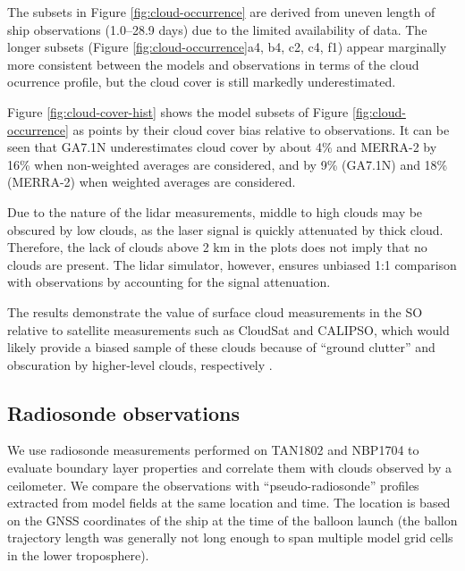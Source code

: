 The subsets in Figure \ref{fig:cloud-occurrence} are derived from uneven
length of ship observations (1.0--28.9 days) due to the limited availability of data.
The longer subsets (Figure \ref{fig:cloud-occurrence}a4, b4, c2, c4, f1)
appear marginally more consistent between the models and observations
in terms of the cloud ocurrence profile, but the cloud cover is still markedly
underestimated.

Figure \ref{fig:cloud-cover-hist} shows the model subsets of Figure
\ref{fig:cloud-occurrence} as points by their cloud cover bias relative to
observations. It can be seen that GA7.1N underestimates cloud cover by about
4\% and MERRA-2 by 16\% when non-weighted averages are considered, and by 9\%
(GA7.1N) and 18\% (MERRA-2) when weighted averages are considered.

Due to the nature of the lidar measurements, middle to high clouds may be
obscured by low clouds, as the laser signal is quickly attenuated by thick
cloud. Therefore, the lack of clouds above 2 \unit{km} in the plots does not
imply that no clouds are present. The lidar simulator, however, ensures
unbiased 1:1 comparison with observations by accounting for the signal
attenuation.

The results demonstrate the value of surface cloud measurements in the SO
relative to satellite measurements such as CloudSat and CALIPSO, which would
likely provide a biased sample of these clouds because of ``ground clutter''
and obscuration by higher-level clouds, respectively \citep{alexander2018}.

\subsection{Radiosonde observations}
\label{sec:radiosonde-observations}

We use radiosonde measurements performed on TAN1802 and NBP1704 to
evaluate boundary layer properties and correlate them with clouds observed by
a ceilometer. We compare the observations with ``pseudo-radiosonde'' profiles
extracted from model fields at the same location and time. The location is
based on the GNSS coordinates of the ship at the time of the balloon launch
(the ballon trajectory length was generally not long enough to span multiple
model grid cells in the lower troposphere).

